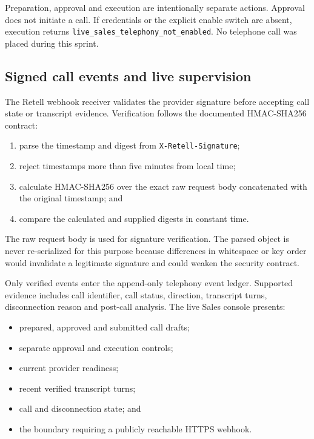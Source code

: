 Preparation, approval and execution are intentionally separate actions. Approval does not initiate a call. If credentials or the explicit enable switch are absent, execution returns \texttt{live\_sales\_telephony\_not\_enabled}. No telephone call was placed during this sprint.

\subsection{Signed call events and live supervision}

The Retell webhook receiver validates the provider signature before accepting call state or transcript evidence. Verification follows the documented HMAC-SHA256 contract:

\begin{enumerate}[leftmargin=*]
    \item parse the timestamp and digest from \texttt{X-Retell-Signature};
    \item reject timestamps more than five minutes from local time;
    \item calculate HMAC-SHA256 over the exact raw request body concatenated with the original timestamp; and
    \item compare the calculated and supplied digests in constant time.
\end{enumerate}

The raw request body is used for signature verification. The parsed object is never re-serialized for this purpose because differences in whitespace or key order would invalidate a legitimate signature and could weaken the security contract.

Only verified events enter the append-only telephony event ledger. Supported evidence includes call identifier, call status, direction, transcript turns, disconnection reason and post-call analysis. The live Sales console presents:

\begin{itemize}[leftmargin=*]
    \item prepared, approved and submitted call drafts;
    \item separate approval and execution controls;
    \item current provider readiness;
    \item recent verified transcript turns;
    \item call and disconnection state; and
    \item the boundary requiring a publicly reachable HTTPS webhook.
\end{itemize}

